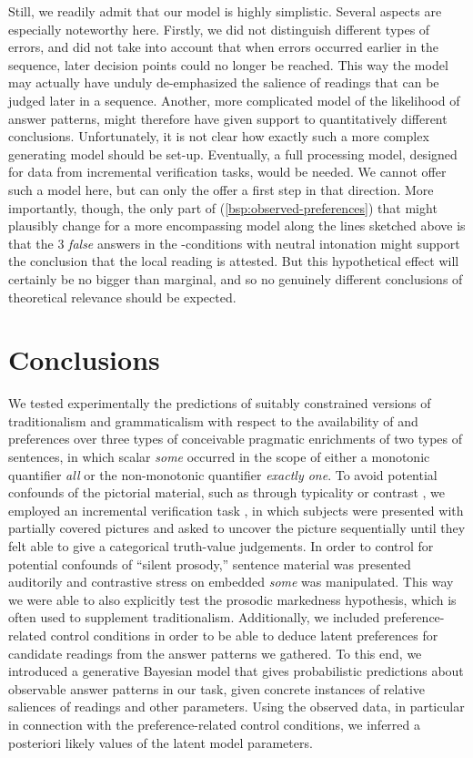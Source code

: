 \documentclass[fleqn,reqno,10pt]{article}
\newcommand{\as}{\acro{as}}
\begin{document}
Still, we readily admit that our model is highly simplistic. Several
aspects are especially noteworthy here. Firstly, we did not
distinguish different types of errors, and did not take into account
that when errors occurred earlier in the sequence, later decision
points could no longer be reached. This way the model may actually
have unduly de-emphasized the salience of readings that can be judged
later in a sequence. Another, more complicated model of the likelihood
of answer patterns, might therefore have given support to
quantitatively different conclusions. Unfortunately, it is not clear
how exactly such a more complex generating model should be
set-up. Eventually, a full processing model, designed for data from
incremental verification tasks, would be needed. We cannot offer such
a model here, but can only the offer a first step in that
direction. More importantly, though, the only part of
(\ref{bsp:observed-preferences}) that might plausibly change for a
more encompassing model along the lines sketched above is that the 3
\emph{false} answers in the \as-conditions with neutral intonation
might support the conclusion that the local reading is attested. But
this hypothetical effect will certainly be no bigger than marginal,
and so no genuinely different conclusions of theoretical relevance
should be expected.

\section{Conclusions}
\label{sec:conclusions}

We tested experimentally the predictions of suitably constrained
versions of traditionalism and grammaticalism with respect to the
availability of and preferences over three types of conceivable
pragmatic enrichments of two types of sentences, in which scalar
\emph{some} occurred in the scope of either a monotonic quantifier
\emph{all} or the non-monotonic quantifier \emph{exactly one}. To
avoid potential confounds of the pictorial material, such as through
typicality or contrast
\citep{Tielvan-Tiel2012:Embedded-Scalar,GeurtsTielvan-Tiel2013:Embedded-Scalar},
we employed an incremental verification task \citep{Conroy2008}, in
which subjects were presented with partially covered pictures and
asked to uncover the picture sequentially until they felt able to give
a categorical truth-value judgements. In order to control for
potential confounds of ``silent prosody,'' sentence material was
presented auditorily and contrastive stress on embedded \emph{some}
was manipulated. This way we were able to also explicitly test the
prosodic markedness hypothesis, which is often used to supplement
traditionalism. Additionally, we included preference-related control
conditions in order to be able to deduce latent preferences for
candidate readings from the answer patterns we gathered. To this end,
we introduced a generative Bayesian model that gives probabilistic
predictions about observable answer patterns in our task, given
concrete instances of relative saliences of readings and other
parameters. Using the observed data, in particular in connection with
the preference-related control conditions, we inferred a posteriori
likely values of the latent model parameters.
\end{document}
